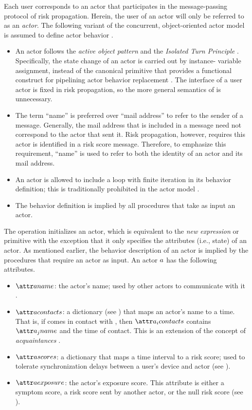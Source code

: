 Each user corresponds to an actor that participates in the message-passing protocol of risk propagation. Herein, the user of an actor will only be referred to as an \emph{actor}. The following variant of the concurrent, object-oriented actor model is assumed to define actor behavior \cite{Agha1990}.
%
\begin{itemize}
	\item An actor follows the \emph{active object pattern} \cite{Lavender1996, Koster2016} and the \emph{Isolated Turn Principle} \cite{Koster2016}. Specifically, the state change of an actor is carried out by instance- variable assignment, instead of the canonical \cBecome{} primitive that provides a functional construct for pipelining actor behavior replacement \cite{Agha1985, Agha1990}. The interface of a user actor is fixed in risk propagation, so the more general semantics of \cBecome{} is unnecessary.
	\item The term ``name'' \cite{Hewitt1977, Agha1985} is preferred over ``mail address'' \cite{Agha1985, Agha1990} to refer to the sender of a message. Generally, the mail address that is included in a message need not correspond to the actor that sent it. Risk propagation, however, requires this actor is identified in a risk score message. Therefore, to emphasize this requirement, ``name'' is used to refer to both the identity of an actor and its mail address.
	\item An actor is allowed to include a loop with finite iteration in its behavior definition; this is traditionally prohibited in the actor model \cite{Agha1985, Agha1990}.
	\item The behavior definition is implied by all procedures that take as input an actor.
\end{itemize}
%
The \cCreateActor{} operation initializes an actor, which is equivalent to the \emph{new expression} \cite{Agha1985} or \cCreate{} primitive \cite{Agha1990} with the exception that it only specifies the attributes (i.e., state) of an actor. As mentioned earlier, the behavior description of an actor is implied by the procedures that require an actor as input. An actor $a$ has the following attributes.
%
\begin{itemize}
	\item $\aActorName$: the actor's name; used by other actors to communicate with it \citep{Hewitt1977, Agha1985}.
	\item $\aActorContacts$: a dictionary (see ) that maps an actor's name to a time. That is, if  comes in contact with , then $\aContacts{\vActor_i}$ contains $\aName{\vActor_j}$ and the time of contact. This is an extension of the concept of \emph{acquaintances} \citep{Hewitt1977, Agha1985}.
	\item $\aActorScores$: a dictionary that maps a time interval to a risk score; used to tolerate synchronization delays between a user's device and actor (see ).
	\item $\aActorExposure$: the actor's exposure score. This attribute is either a symptom score, a risk score sent by another actor, or the null risk score (see \cNullRiskScore{}).
\end{itemize}
